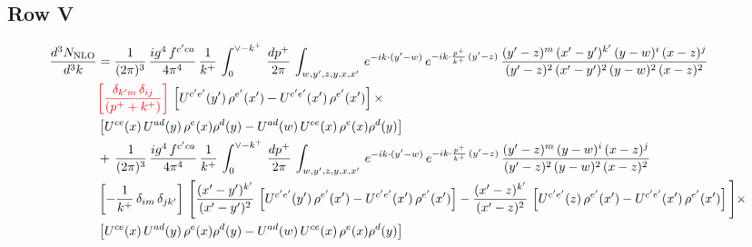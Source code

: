 \documentclass[9pt]{article}
\numberwithin{equation}{section}
\newcommand{\chg}[1]{{\color{red}#1}}
\begin{document}
\subsection{Row V}
\begin{align}
    \frac{d^{3}N_{\rm NLO}}{d^{3}k} & =  \frac{1}{(2\pi)^{3}}\, \frac{ig^{4}\,f^{c'ca}}{4\pi^{4}}\, \frac{1}{k^{+}}\,\int_{0}^{\vee-k^{+}}\, \frac{dp^{+}}{2\pi}\, \int_{w,y',z,y,x,x'}\, e^{-ik\cdot (y'-w)}\, e^{-ik\cdot \frac{p^{+}}{k^{+}}\,(y'-z)}\,\frac{(y'-z)^{m}\,(x'-y')^{k'}\,(y-w)^{i}\,(x-z)^{j}}{(y'-z)^{2}\,(x'-y')^{2}\,(y-w)^{2}\,(x-z)^{2}}\notag \\ & \chg{\left[\frac{\delta_{k'm}\,\delta_{ij}}{(p^{+}+k^{+})}\right]}\, \left[U^{c'e'}(y')\,\rho^{e'}(x')-U^{c'e'}(x')\,\rho^{e'}(x')\right]\times \notag \\ &  \left[U^{ce}(x)\,U^{ad}(y)\,\rho^{e}(x)\rho^{d}(y)-U^{ad}(w)\,U^{ce}(x)\,\rho^{e}(x)\rho^{d}(y)\right] \notag \\
&   +\,\frac{1}{(2\pi)^{3}}\, \frac{ig^{4}\,f^{c'ca}}{4\pi^{4}}\, \frac{1}{k^{+}}\,\int_{0}^{\vee-k^{+}}\, \frac{dp^{+}}{2\pi}\, \int_{w,y',z,y,x,x'}\, e^{-ik\cdot (y'-w)}\, e^{-ik\cdot \frac{p^{+}}{k^{+}}\,(y'-z)}\,\frac{(y'-z)^{m}\,(y-w)^{i}\,(x-z)^{j}}{(y'-z)^{2}\,(y-w)^{2}\,(x-z)^{2}}\notag \\ &   \left[-\frac{1}{k^{+}}\, \delta_{im}\, \delta_{jk'}\right]\, \Bigg[\frac{(x'-y')^{k'}}{(x'-y')^{2}}\,\left[U^{c'e'}(y')\,\rho^{e'}(x')-U^{c'e'}(x')\,\rho^{e'}(x')\right] -\frac{(x'-z)^{k'}}{(x'-z)^{2}}\,\left[U^{c'e'}(z)\,\rho^{e'}(x')-U^{c'e'}(x')\,\rho^{e'}(x')\right]\Bigg]\times\notag \\ &      \left[U^{ce}(x)\,U^{ad}(y)\,\rho^{e}(x)\rho^{d}(y)-U^{ad}(w)\,U^{ce}(x)\,\rho^{e}(x)\rho^{d}(y)\right] 
\end{align}
\end{document}

